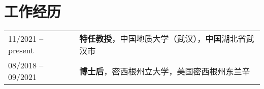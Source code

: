 \section*{工作经历}
\begin{tabular}{p{} p{}}
11/2021 -- present & \textbf{特任教授}，中国地质大学（武汉），中国湖北省武汉市 \\
08/2018 -- 09/2021 & \textbf{博士后}，密西根州立大学，美国密西根州东兰辛 \\
\end{tabular}
